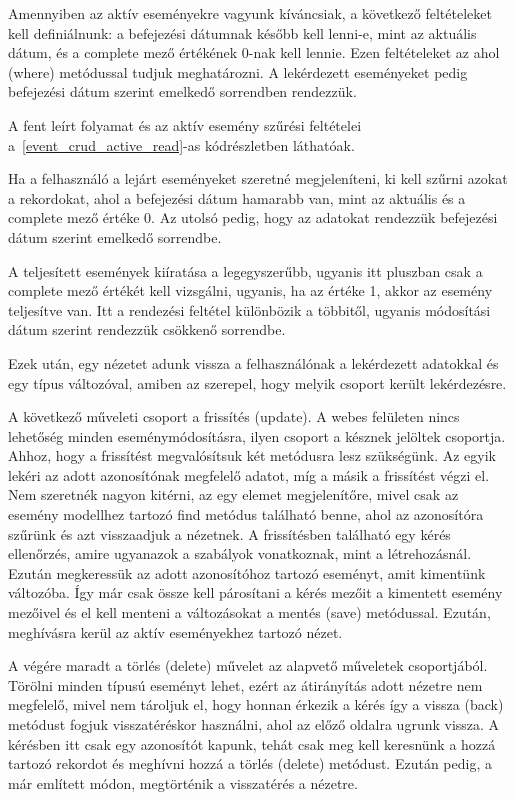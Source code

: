 \documentclass[
]{thesis-ekf}
\theoremstyle{definition}
\theoremstyle{remark}
\begin{document}
	
	Amennyiben az aktív eseményekre vagyunk kíváncsiak, a következő feltételeket kell definiálnunk: a befejezési dátumnak később kell lenni-e, mint az aktuális dátum, és a complete mező értékének 0-nak kell lennie. Ezen feltételeket az ahol (where) metódussal tudjuk meghatározni. A lekérdezett eseményeket pedig befejezési dátum szerint emelkedő sorrendben rendezzük.
	
	A fent leírt folyamat és az aktív esemény szűrési feltételei a~\ref{event_crud_active_read}-as kódrészletben láthatóak.
	
	
	
	Ha a felhasználó a lejárt eseményeket szeretné megjeleníteni, ki kell szűrni azokat a rekordokat, ahol a befejezési dátum hamarabb van, mint az aktuális és a complete mező értéke 0. Az utolsó pedig, hogy az adatokat rendezzük befejezési dátum szerint emelkedő sorrendbe.
	
	A teljesített események kiíratása a legegyszerűbb, ugyanis itt pluszban csak a complete mező értékét kell vizsgálni, ugyanis, ha az értéke 1, akkor az esemény teljesítve van. Itt a rendezési feltétel különbözik a többitől, ugyanis módosítási dátum szerint rendezzük csökkenő sorrendbe.
	
	Ezek után, egy nézetet adunk vissza a felhasználónak a lekérdezett adatokkal és egy típus változóval, amiben az szerepel, hogy melyik csoport került lekérdezésre.
	
	A következő műveleti csoport a frissítés (update). A webes felületen nincs lehetőség minden eseménymódosításra, ilyen csoport a késznek jelöltek csoportja. Ahhoz, hogy a frissítést megvalósítsuk két metódusra lesz szükségünk. Az egyik lekéri az adott azonosítónak megfelelő adatot, míg a másik a frissítést végzi el. Nem szeretnék nagyon kitérni, az egy elemet megjelenítőre, mivel csak az esemény modellhez tartozó find metódus található benne, ahol az azonosítóra szűrünk és azt visszaadjuk a nézetnek. A frissítésben található egy kérés ellenőrzés, amire ugyanazok a szabályok vonatkoznak, mint a létrehozásnál. Ezután megkeressük az adott azonosítóhoz tartozó eseményt, amit kimentünk változóba. Így már csak össze kell párosítani a kérés mezőit a kimentett esemény mezőivel és el kell menteni a változásokat a mentés (save) metódussal. Ezután, meghívásra kerül az aktív eseményekhez tartozó nézet. 
	
	A végére maradt a törlés (delete) művelet az alapvető műveletek csoportjából. Törölni minden típusú eseményt lehet, ezért az átirányítás adott nézetre nem megfelelő, mivel nem tároljuk el, hogy honnan érkezik a kérés így a vissza (back) metódust fogjuk visszatéréskor használni, ahol az előző oldalra ugrunk vissza. A kérésben itt csak egy azonosítót kapunk, tehát csak meg kell keresnünk a hozzá tartozó rekordot és meghívni hozzá a törlés (delete) metódust. Ezután pedig, a már említett módon, megtörténik a visszatérés a nézetre. 
	
\end{document}

